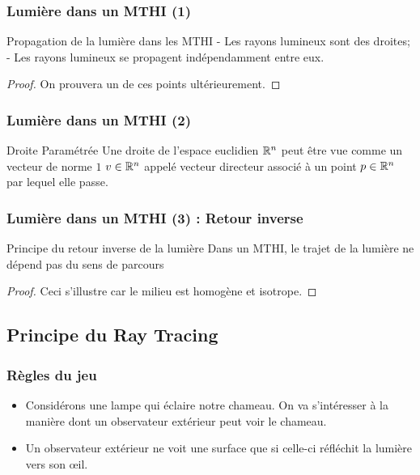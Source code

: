 \documentclass{beamercours}
\begin{document}
\begin{frame}
\frametitle{Lumière dans un MTHI (1)}
\begin{théorème}{Propagation de la lumière dans les MTHI}{}
- Les rayons lumineux sont des droites;\\
- Les rayons lumineux se propagent indépendamment entre eux.
\end{théorème}
\begin{proof}
	On prouvera un de ces points ultérieurement.
\end{proof}
\end{frame}
\begin{frame}
\frametitle{Lumière dans un MTHI (2)}
\begin{propositionfr}{Droite Paramétrée}{}
	Une droite de l'espace euclidien $\mathbb{R}^{n}$ peut être vue comme un vecteur de norme $1$ $v \in \mathbb{R}^{n}$ appelé vecteur directeur associé à un point $p \in \mathbb{R}^{n}$ par lequel elle passe.
\end{propositionfr}
\end{frame}
\begin{frame}
\frametitle{Lumière dans un MTHI (3) : Retour inverse}
\begin{théorème}{Principe du retour inverse de la lumière}{}
Dans un MTHI, le trajet de la lumière ne dépend pas du sens de parcours
\end{théorème}
\begin{proof}
	Ceci s'illustre car le milieu est homogène et isotrope.
\end{proof}
\end{frame}

\subsection{Principe du Ray Tracing}

\begin{frame}
\frametitle{Règles du jeu}
\begin{itemize}
\item Considérons une lampe qui éclaire notre chameau. On va s'intéresser à la manière dont un observateur extérieur peut voir le chameau.
\item Un observateur extérieur ne voit une surface que si celle-ci réfléchit la lumière vers son \oe il.
\end{itemize}
\end{frame}
\end{document}
